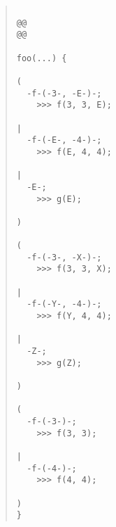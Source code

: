 \documentclass{article}
\begin{document}
\begin{quote}\begin{verbatim}

@@
@@

foo(...) {
  
(
  -f-(-3-, -E-)-;
    >>> f(3, 3, E);
  
|
  -f-(-E-, -4-)-;
    >>> f(E, 4, 4);
  
|
  -E-;
    >>> g(E);
  
)
  
(
  -f-(-3-, -X-)-;
    >>> f(3, 3, X);
  
|
  -f-(-Y-, -4-)-;
    >>> f(Y, 4, 4);
  
|
  -Z-;
    >>> g(Z);
  
)
  
(
  -f-(-3-)-;
    >>> f(3, 3);
  
|
  -f-(-4-)-;
    >>> f(4, 4);
  
)
}
\end{verbatim}\end{quote}
\end{document}
